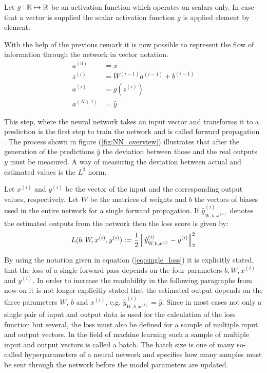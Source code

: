 \begin{remark}
	Let $g: \mathbb{R} \mapsto \mathbb{R}$ be an activation function which operates on scalars only. In case that a vector is supplied the scalar activation function $g$ is applied element by element. 
\end{remark}

With the help of the previous remark it is now possible to represent the flow of information through the network in vector notation.
\begin{equation}
\begin{aligned}
	a^{(0)} 	&= x								\\
	z^{(i)} 	&= W^{(i-1)} a^{(i-1)} + b^{(i-1)} 	\\
	a^{(i)}		&= g(z^{(i)}) 						\\
	a^{(N+1)} 	&= \hat{y}
\end{aligned}
\end{equation}

This step, where the neural network takes an input vector and transforms it to a prediction is the first step to train the network and is called forward propagation \cite{Propagation}. The process shown in figure (\ref{fig:NN_overview}) illustrates that after the generation of the predictions $\hat{y}$ the deviation between those and the real outputs $y$ must be measured. A way of measuring the deviation between actual and estimated values is the $L^2$ norm.

\begin{definition}
	Let $x^{(i)}$ and $y^{(i)}$ be the vector of the input and the corresponding output values, respectively. Let $W$ be the matrices of weights and $b$ the vectors of biases used in the entire network for a single forward propagation. If $\hat{y}_{W,b,x^{(i)}}^{(i)}$ denotes the estimated outputs from the network then the loss score is given by:	
	\begin{equation}\label{eq:single_loss}
		L(b, W, x^{(i)}, y^{(i)}) := \frac{1}{2} \left\lVert\hat{y}_{W,b,x^{(i)}}^{(i)} - y^{(i)}\right\rVert^2_2
	\end{equation}
\end{definition}

By using the notation given in equation (\ref{eq:single_loss}) it is explicitly stated, that the loss of a single forward pass depends on the four parameters $b, W, x^{(i)}$ and $y^{(i)}$. In order to increase the readability in the following paragraphs from now on it is not longer explicitly stated that the estimated output depends on the three parameters $W$, $b$ and $x^{(i)}$, e.g. $\hat{y}_{W,b,x^{(i)}}^{(i)} = \hat{y}$. Since in most cases not only a single pair of input and output data is used for the calculation of the loss function but several, the loss must also be defined for a sample of multiple input and output vectors. In the field of machine learning such a sample of multiple input and output vectors is called a batch. The batch size is one of many so-called hyperparameters of a neural network and specifies how many samples must be sent through the network before the model parameters are updated.

